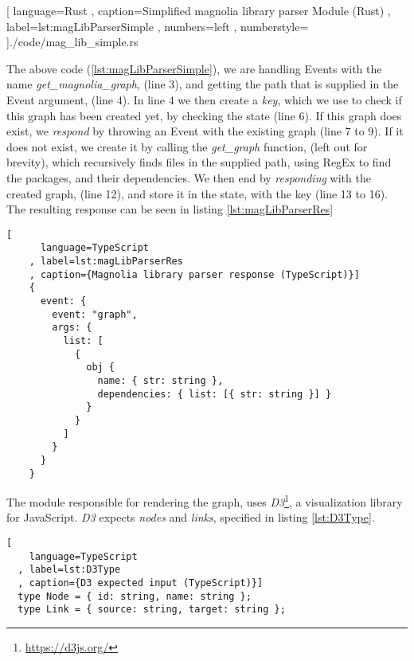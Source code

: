 \begin{code}[H]
  
    [ language=Rust
    , caption={Simplified magnolia library parser Module (Rust)}
    , label=lst:magLibParserSimple
    , numbers=left
    , numberstyle=\tiny\color{gray}
    ]{./code/mag\_lib\_simple.rs}
\end{code}

The above code (\ref{lst:magLibParserSimple}), we are handling Events with the name
\textit{get\_magnolia\_graph}, (line 3), and getting the path that is supplied in
the Event argument, (line 4). In line 4 we then create a \textit{key}, which we
use to check if this graph has been created yet, by checking the state (line 6).
If this graph does exist, we \textit{respond} by throwing an Event with the
existing graph (line 7 to 9). If it does not exist, we create it by calling the
\textit{get\_graph} function, (left out for brevity), which recursively finds
files in the supplied path, using RegEx to find the packages, and their
dependencies. We then end by \textit{responding} with the created graph,
(line 12), and store it in the state, with the key (line 13 to 16). The
resulting response can be seen in listing \ref{lst:magLibParserRes}

\begin{code}[H]
  \begin{lstlisting}[
      language=TypeScript
    , label=lst:magLibParserRes
    , caption={Magnolia library parser response (TypeScript)}]
    {
      event: {
        event: "graph",
        args: {
          list: [
            {
              obj {
                name: { str: string },
                dependencies: { list: [{ str: string }] }
              }
            }
          ]
        }
      }
    }
  \end{lstlisting}
\end{code}

The module responsible for rendering the graph, uses
\textit{D3}\footnote{\url{https://d3js.org/}}, a visualization library for
JavaScript. \textit{D3} expects \textit{nodes} and \textit{links}, specified in
listing \ref{lst:D3Type}.

\begin{lstlisting}[
    language=TypeScript
  , label=lst:D3Type
  , caption={D3 expected input (TypeScript)}]
  type Node = { id: string, name: string };
  type Link = { source: string, target: string };
\end{lstlisting}


